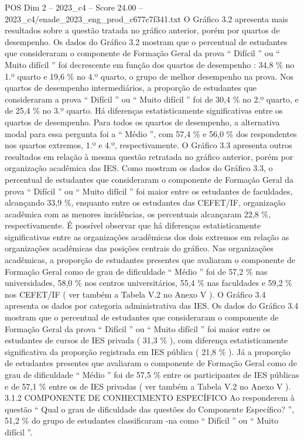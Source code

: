 \begin{textsample}{POS Dim 2 – 2023\_c4 – Score 24.00 – 2023\_c4/enade\_2023\_eng\_prod\_c677c7f341.txt}
O Gráfico 3.2 apresenta mais resultados sobre a questão tratada no gráfico anterior, porém por quartos de desempenho.
Os dados do Gráfico 3.2 mostram que o percentual de estudantes que consideraram o componente de Formação Geral da prova “ Difícil ” ou “ Muito difícil ” foi decrescente em função dos quartos de desempenho : 34,8 \% no 1.º quarto e 19,6 \% no 4.º quarto, o grupo de melhor desempenho na prova.
Nos quartos de desempenho intermediários, a proporção de estudantes que consideraram a prova “ Difícil ” ou “ Muito difícil ” foi de 30,4 \% no 2.º quarto, e de 25,4 \% no 3.º quarto.
Há diferenças estatisticamente significativas entre os quartos de desempenho.
Para todos os quartos de desempenho, a alternativa modal para essa pergunta foi a “ Médio ”, com 57,4 \% e 56,0 \% dos respondentes nos quartos extremos, 1.º e 4.º, respectivamente.
O Gráfico 3.3 apresenta outros resultados em relação à mesma questão retratada no gráfico anterior, porém por organização acadêmica das IES.
Como mostram os dados do Gráfico 3.3, o percentual de estudantes que consideraram o componente de Formação Geral da prova “ Difícil ” ou “ Muito difícil ” foi maior entre os estudantes de faculdades, alcançando 33,9 \%, enquanto entre os estudantes das CEFET/IF, organização acadêmica com as menores incidências, os percentuais alcançaram 22,8 \%, respectivamente.
É possível observar que há diferenças estatisticamente significativas entre as organizações acadêmicas dos dois extremos em relação as organizações acadêmicas das posições centrais do gráfico.
Nas organizações acadêmicas, a proporção de estudantes presentes que avaliaram o componente de Formação Geral como de grau de dificuldade “ Médio ” foi de 57,2 \% nas universidades, 58,0 \% nos centros universitários, 55,4 \% nas faculdades e 59,2 \% nos CEFET/IF ( ver também a Tabela V.2 no Anexo V ).
O Gráfico 3.4 apresenta os dados por categoria administrativa das IES.
Os dados do Gráfico 3.4 mostram que o percentual de estudantes que consideraram o componente de Formação Geral da prova “ Difícil ” ou “ Muito difícil ” foi maior entre os estudantes de cursos de IES privada ( 31,3 \% ), com diferença estatisticamente significativa da proporção registrada em IES pública ( 21,8 \% ).
Já a proporção de estudantes presentes que avaliaram o componente de Formação Geral como de grau de dificuldade “ Médio ” foi de 57,5 \% entre os participantes de IES públicas e de 57,1 \% entre os de IES privadas ( ver também a Tabela V.2 no Anexo V ). 3.1.2 COMPONENTE DE CONHECIMENTO ESPECÍFICO Ao responderem à questão “ Qual o grau de dificuldade das questões do Componente Específico? ”, 51,2 \% do grupo de estudantes classificaram -na como “ Difícil ” ou “ Muito difícil ”.

\end{textsample}
